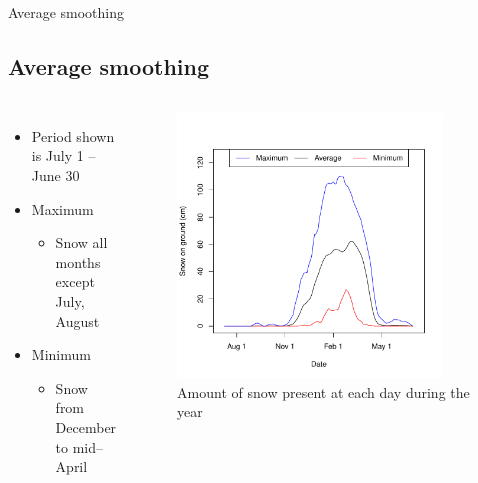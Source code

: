 \documentclass{beamer}
\begin{document}
\begin{frame}{Average smoothing}

\subsection{Average smoothing}

\begin{columns}


{\small
\begin{itemize}
\item Period shown is July 1 -- June 30
\item Maximum
\begin{itemize}
\item Snow all months except July, August
\end{itemize}
\item Minimum
\begin{itemize}
\item Snow from December to mid--April
\end{itemize}
\end{itemize}
}

\vspace{10mm}


\vspace{-18mm}
\begin{figure}
\includegraphics[width=0.9\textwidth]{report-averagetsplot}
\vspace{-2mm}
\caption{{\footnotesize Amount of snow present at each day during the year}}
\vspace{10mm}
\end{figure}

\end{columns}

\end{frame}
\end{document}
